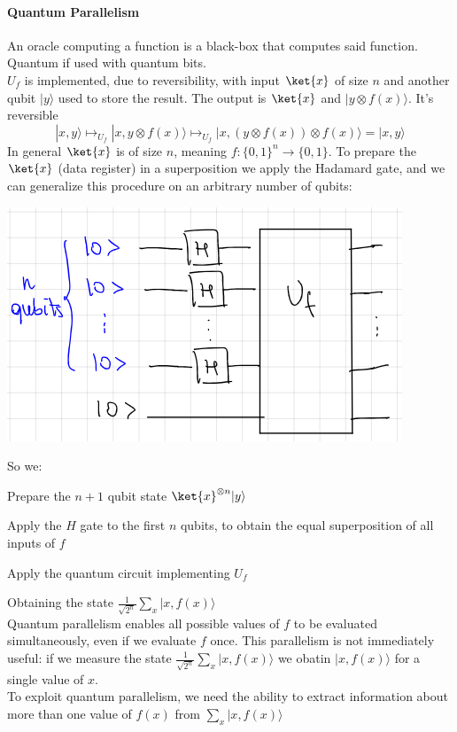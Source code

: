 \documentclass[10pt]{report}
\begin{document}
\paragraph{Quantum Parallelism} An oracle computing a function is a black-box that computes said function. Quantum if used with quantum bits.\\
$U_f$ is implemented, due to reversibility, with input $\ket{x}$ of size $n$ and another qubit $|y\rangle$ used to store the result. The output is $\ket{x}$ and $|y\otimes f(x)\rangle$. It's reversible
$$|x,y\rangle\mapsto_{U_f} |x,y\otimes f(x)\rangle \mapsto_{U_f} |x, (y\otimes f(x))\otimes f(x) \rangle = |x,y\rangle$$
In general $\ket{x}$ is of size $n$, meaning $f:\{0,1\}^n\rightarrow\{0,1\}$. To prepare the $\ket{x}$ (data register) in a superposition we apply the Hadamard gate, and we can generalize this procedure on an arbitrary number of qubits:\begin{center}
	\includegraphics[scale=0.5]{20.png}
\end{center}
So we:\begin{list}{}{}
	\item Prepare the $n+1$ qubit state $\ket{x}^{\otimes n}|y\rangle$
	\item Apply the $H$ gate to the first $n$ qubits, to obtain the equal superposition of all inputs of $f$
	\item Apply the quantum circuit implementing $U_f$
\end{list}
Obtaining the state $\frac{1}{\sqrt{2^n}}\sum_x|x,f(x)\rangle$\\
Quantum parallelism enables all possible values of $f$ to be evaluated simultaneously, even if we evaluate $f$ once. This parallelism is not immediately useful: if we measure the state $\frac{1}{\sqrt{2^n}}\sum_x|x,f(x)\rangle$ we obatin $|x,f(x)\rangle$ for a single value of $x$.\\
To exploit quantum parallelism, we need the ability to extract information about more than one value of $f(x)$ from $\sum_x |x,f(x)\rangle$
\end{document}
